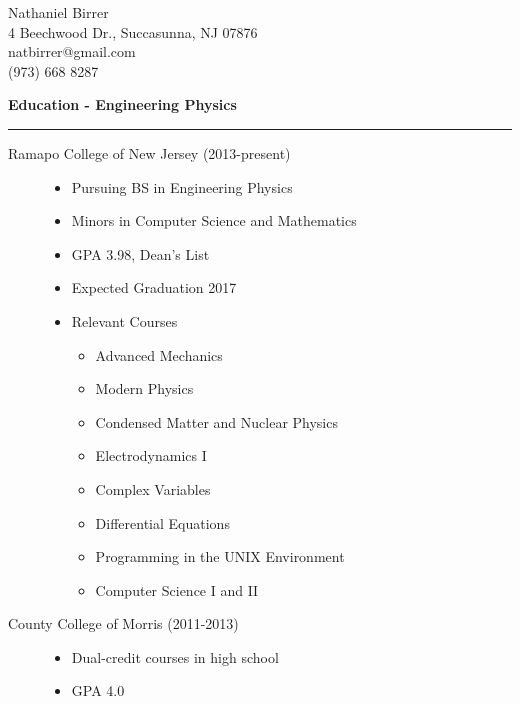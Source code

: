 \documentclass[letterpaper,10pt]{article}
\begin{document}
 \begin{center}
  \Large
  Nathaniel Birrer \\
  \normalsize
  4 Beechwood Dr., Succasunna, NJ 07876 \\
  natbirrer@gmail.com \\
  (973) 668 8287 \\
 \end{center}
 
 \large
 \textbf{Education - Engineering Physics}
 \vspace{1 mm}
 \hrule
 \normalsize
 
 \begin{description}
 
   \item[Ramapo College of New Jersey (2013-present)] \hfill
   \begin{itemize}
    \item Pursuing BS in Engineering Physics
    \item Minors in Computer Science and Mathematics
    \item GPA 3.98, Dean's List
    \item Expected Graduation 2017
    \item Relevant Courses \hfill
     \begin{multicols}{2}
      \begin{itemize}
      \item Advanced Mechanics
      \item Modern Physics
      \item Condensed Matter and Nuclear Physics
      \item Electrodynamics I
      \item Complex Variables
      \item Differential Equations
      \item Programming in the UNIX Environment
      \item Computer Science I and II
      \end{itemize}
     \end{multicols}
   \end{itemize}

   \item[County College of Morris (2011-2013)] \hfill
   \begin{itemize}
    \item Dual-credit courses in high school
    \item GPA 4.0
   \end{itemize}

 \end{description}
 
\end{document}
